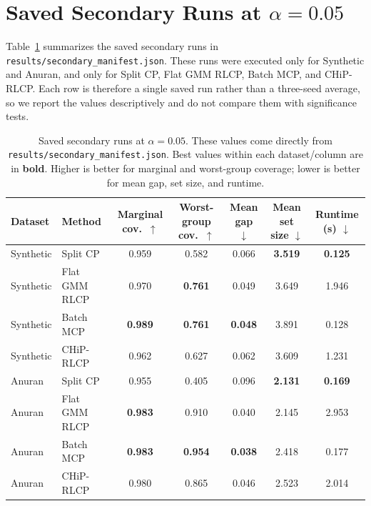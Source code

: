 \documentclass{article}
\newcommand{\chip}{CHiP-RLCP}
\begin{document}
\section{Saved Secondary Runs at \texorpdfstring{$\alpha=0.05$}{alpha=0.05}}
\label{app:secondary-alpha}
Table~\ref{tab:alpha005} summarizes the saved secondary runs in \texttt{results/secondary\_manifest.json}. These runs were executed only for Synthetic and Anuran, and only for Split CP, Flat GMM RLCP, Batch MCP, and \chip. Each row is therefore a single saved run rather than a three-seed average, so we report the values descriptively and do not compare them with significance tests.

\begin{table}[t]
\caption{Saved secondary runs at $\alpha=0.05$. These values come directly from \texttt{results/secondary\_manifest.json}. Best values within each dataset/column are in \textbf{bold}. Higher is better for marginal and worst-group coverage; lower is better for mean gap, set size, and runtime.}
\label{tab:alpha005}
\centering
\small
\setlength{\tabcolsep}{4pt}
\begin{tabular}{llccccc}
\toprule
Dataset & Method & Marginal cov.\ $\uparrow$ & Worst-group cov.\ $\uparrow$ & Mean gap $\downarrow$ & Mean set size $\downarrow$ & Runtime (s) $\downarrow$ \\
\midrule
Synthetic & Split CP & 0.959 & 0.582 & 0.066 & \textbf{3.519} & \textbf{0.125} \\
Synthetic & Flat GMM RLCP & 0.970 & \textbf{0.761} & 0.049 & 3.649 & 1.946 \\
Synthetic & Batch MCP & \textbf{0.989} & \textbf{0.761} & \textbf{0.048} & 3.891 & 0.128 \\
Synthetic & \chip & 0.962 & 0.627 & 0.062 & 3.609 & 1.231 \\
\midrule
Anuran & Split CP & 0.955 & 0.405 & 0.096 & \textbf{2.131} & \textbf{0.169} \\
Anuran & Flat GMM RLCP & \textbf{0.983} & 0.910 & 0.040 & 2.145 & 2.953 \\
Anuran & Batch MCP & \textbf{0.983} & \textbf{0.954} & \textbf{0.038} & 2.418 & 0.177 \\
Anuran & \chip & 0.980 & 0.865 & 0.046 & 2.523 & 2.014 \\
\bottomrule
\end{tabular}
\end{table}



\end{document}

